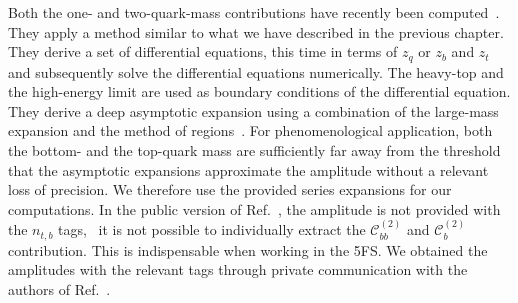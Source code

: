 Both the one- and two-quark-mass contributions have recently been computed~\cite{Czakon:2020vql, Niggetiedt:2023uyk}. They apply a method similar to what we have described in the previous chapter. They derive a set of differential equations, this time in terms of $z_q$ or $z_b$ and $z_t$ and subsequently solve the differential equations numerically. The heavy-top and the high-energy limit are used as boundary conditions of the differential equation. They derive a deep asymptotic expansion using a combination of the large-mass expansion and the method of regions~\cite{Beneke:1997zp}. For phenomenological application, both the bottom- and the top-quark mass are sufficiently far away from the threshold that the asymptotic expansions approximate the amplitude without a relevant loss of precision. We therefore use the provided series expansions for our computations. In the public version of Ref.~\cite{Czakon:2020vql}, the amplitude is not provided with the $n_{t,b}$ tags, \ie\ it is not possible to individually extract the $\mathcal{C}_{bb}^{(2)}$ and $\mathcal{C}_{b}^{(2)}$ contribution. This is indispensable when working in the 5\acs{FS}. We obtained the amplitudes with the relevant tags through private communication with the authors of Ref.~\cite{Czakon:2020vql}.

